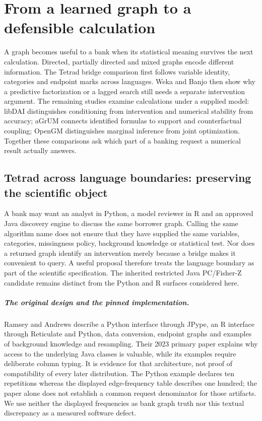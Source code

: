 \chapter{From a learned graph to a defensible calculation}
A graph becomes useful to a bank when its statistical meaning survives
the next calculation. Directed, partially directed and mixed graphs encode
different information. The Tetrad bridge comparison first follows variable
identity, categories and endpoint marks across languages. Weka and Banjo then
show why a predictive factorization or a lagged search still needs a separate
intervention argument. The remaining studies examine calculations under a
supplied model: libDAI distinguishes conditioning from intervention and
numerical stability from accuracy; aGrUM connects identified formulas to
support and counterfactual coupling; OpenGM distinguishes marginal inference
from joint optimization. Together these comparisons ask which part of a
banking request a numerical result actually answers.



\section{Tetrad across language boundaries: preserving the scientific object}
\label{sec:exec24-tetrad-bridge-reuse}

A bank may want an analyst in Python, a model reviewer in R and an approved
Java discovery engine to discuss the same borrower graph. Calling the same
algorithm name does not ensure that they have supplied the same variables,
categories, missingness policy, background knowledge or statistical test.
Nor does a returned graph identify an intervention merely because a bridge
makes it convenient to query. A useful proposal therefore treats the language
boundary as part of the scientific specification. The inherited restricted
Java PC/Fisher-Z candidate remains distinct from the Python and R surfaces
considered here.~\citep{exec13_tetrad_reuse_decision,exec24_pytetrad_source}

\paragraph{The original design and the pinned implementation.}
Ramsey and Andrews describe a Python interface through JPype, an R interface
through Reticulate and Python, data conversion, endpoint graphs and examples
of background knowledge and resampling. Their 2023 primary paper explains why
access to the underlying Java classes is valuable, while its examples require
deliberate column typing. It is evidence for that architecture, not proof of
compatibility of every later distribution. The Python example declares ten
repetitions whereas the displayed edge-frequency table describes one hundred;
the paper alone does not establish a common request denominator for those
artifacts. We use neither the displayed frequencies as bank graph truth nor
this textual discrepancy as a measured software defect.~\citep{exec24_pytetrad_paper}

